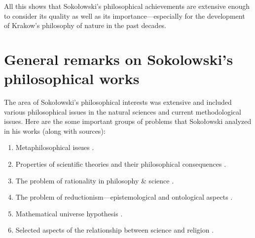 \documentclass[%
  manuscript=article,
  year=2024,
  volume=77,
  doi=00000.000,
]{zfn}
\begin{document}
All this shows that Sokołowski's philosophical achievements are extensive enough to consider its quality as well as its importance---especially for the development of Krakow's philosophy of nature in the past decades.



\section{General remarks on Sokolowski's philosophical works }

The area of Sokołowski's philosophical interests was extensive and included various philosophical issues in the natural sciences and current methodological issues. Here are the some important groups of problems that Sokołowski analyzed in his works (along with sources):



\begin{enumerate}[label=\alph*.]

\item Metaphilosophical issues 
\parencites[numerous remarks in:][]{Sokoowski1986Pluralizm}[][]{Sokoowski1989Gos}[][]{Sokoowski1990Nadwyzkowosc}[][]{Sokoowski2014Czy}[][]{Sokoowski2017Kopoty}.%


\item Properties of scientific theories and their philosophical consequences 
\parencites[][]{Sokoowski1978Czy}[][]{Sokoowski1983Jezyk}[][]{Sokoowski1986Pluralizm}[][]{Sokoowski1987Alberta}[][]{Sokoowski1989Gos}[][]{Sokoowski1994Wszechswiat}[][]{Sokoowski2000Czas}[][]{Sokoowski2006Teorie}[][]{Sokoowski2007Czowiek}[][]{Sokoowski2008Czego}[][]{Sokoowski2014Czy}[][]{Sokoowski2015Granice}[][]{Sokoowski2017Kopoty}.%


\item The problem of rationality in philosophy \& science 
\parencites[][]{Sokoowski2006Alicja}[][]{Sokoowski2011O}.%


\item The problem of reductionism---epistemological and ontological aspects 
\parencites[][]{Sokoowski1996W}[][]{Sokoowski1999Maa}[][]{Sokoowski2001Wspoczesne}.%


\item Mathematical universe hypothesis 
\parencites[][]{Sokoowski1990Nadwyzkowosc}[][]{Sokoowski2011O}[][]{Sokoowski2011Pare}[][]{Sokoowski2015Co}.%


\item Selected aspects of the relationship between science and religion 
\parencites[][]{Sokoowski1990Nadwyzkowosc}[][]{Sokoowski1993Koscio}[][]{Sokoowski2001Wspoczesne}[][]{Sokoowski2011O}[][]{Sokoowski2014Czy}.%


\end{enumerate}
\end{document}
